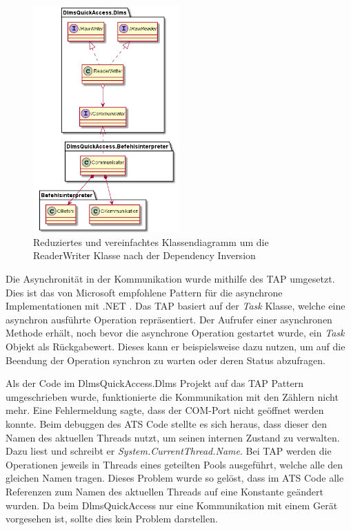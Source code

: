 \begin{figure}[H]
   \centering
   \includegraphics[width=0.5\textwidth]{gfx/dlms_nachher.png}
   \caption{
      Reduziertes und vereinfachtes Klassendiagramm um die ReaderWriter Klasse nach der Dependency Inversion
   }
   \label{fig:dlms_nachher}
\end{figure}

Die Asynchronität in der Kommunikation wurde mithilfe des \ac{TAP} umgesetzt.
Dies ist das von Microsoft empfohlene Pattern für die asynchrone Implementationen mit .NET \parencite{async}.
Das \ac{TAP} basiert auf der \textit{Task} Klasse, welche eine asynchron ausführte Operation repräsentiert.
Der Aufrufer einer asynchronen Methode erhält, noch bevor die asynchrone Operation gestartet wurde, ein \textit{Task} Objekt als Rückgabewert.
Dieses kann er beispielsweise dazu nutzen, um auf die Beendung der Operation synchron zu warten oder deren Status abzufragen.

Als der Code im DlmsQuickAccess.Dlms Projekt auf das \ac{TAP} Pattern umgeschrieben wurde, funktionierte die Kommunikation mit den Zählern nicht mehr.
Eine Fehlermeldung sagte, dass der COM-Port nicht geöffnet werden konnte.
Beim debuggen des \ac{ATS} Code stellte es sich heraus, dass dieser den Namen des aktuellen Threads nutzt, um seinen internen Zustand zu verwalten.
Dazu liest und schreibt er \textit{System.CurrentThread.Name}.
Bei \ac{TAP} werden die Operationen jeweils in Threads eines geteilten Pools ausgeführt, welche alle den gleichen Namen tragen.
Dieses Problem wurde so gelöst, dass im \ac{ATS} Code alle Referenzen zum Namen des aktuellen Threads auf eine Konstante geändert wurden.
Da beim DlmsQuickAccess nur eine Kommunikation mit einem Gerät vorgesehen ist, sollte dies kein Problem darstellen.


